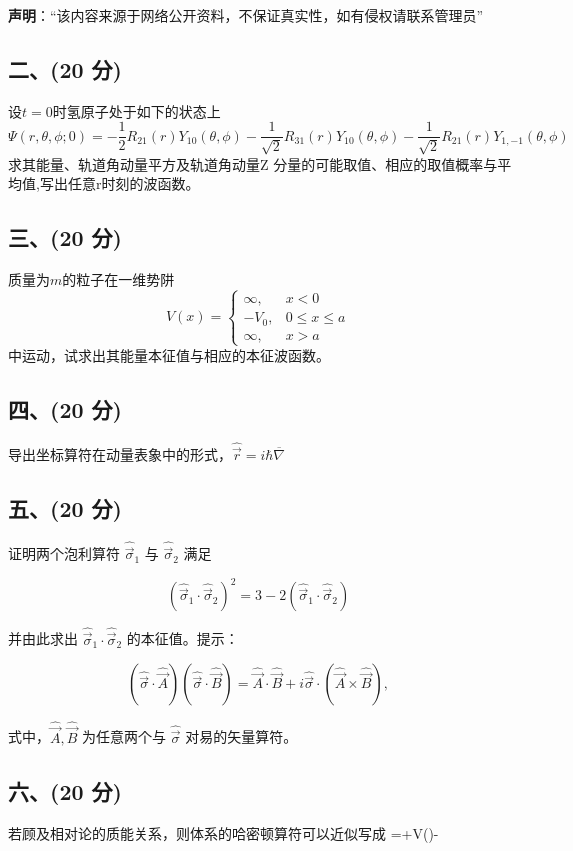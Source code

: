 
\textbf{声明}：“该内容来源于网络公开资料，不保证真实性，如有侵权请联系管理员”

\subsection{二、(20 分)}
设$t=0$时氢原子处于如下的状态上
$$\Psi(r, \theta, \phi; 0) = -\frac{1}{2} R_{21}(r) Y_{10} (\theta, \phi) - \frac{1}{\sqrt{2}} R_{31}(r) Y_{10} (\theta, \phi) - \frac{1}{\sqrt{2}} R_{21}(r) Y_{1,-1} (\theta, \phi)~$$
求其能量、轨道角动量平方及轨道角动量Z 分量的可能取值、相应的取值概率与平均值,写出任意r时刻的波函数。
\subsection{三、(20 分)}
质量为$m$的粒子在一维势阱
\[
V(x) = \begin{cases} 
\infty, & x < 0 \\
-V_0, & 0 \leq x \leq a \\
\infty, & x > a
\end{cases}~
\] 
中运动，试求出其能量本征值与相应的本征波函数。
\subsection{四、(20 分)}
导出坐标算符在动量表象中的形式，$\hat{\vec{r}} = i\hbar\overline{\nabla}$
\subsection{五、(20 分)}
证明两个泡利算符 $\hat{\vec{\sigma}}_1$ 与 $\hat{\vec{\sigma}}_2$ 满足

$$(\hat{\vec{\sigma}}_1 \cdot \hat{\vec{\sigma}}_2)^2 = 3 - 2 (\hat{\vec{\sigma}}_1 \cdot \hat{\vec{\sigma}}_2)~$$

并由此求出 $\hat{\vec{\sigma}}_1 \cdot \hat{\vec{\sigma}}_2$ 的本征值。提示：

$$ \left( \hat{\vec{\sigma}} \cdot \hat{\vec{A}} \right) \left( \hat{\vec{\sigma}} \cdot \hat{\vec{B}} \right) = \hat{\vec{A}} \cdot \hat{\vec{B}} + i \hat{\vec{\sigma}} \cdot (
\hat{\vec{A}} \times \hat{\vec{B}}), ~$$

式中，$\hat{\vec{A}}, \hat{\vec{B}}$ 为任意两个与 $\hat{\vec{\sigma}}$ 对易的矢量算符。
\subsection{六、(20 分)}
若顾及相对论的质能关系，则体系的哈密顿算符可以近似写成
$$=+V()-